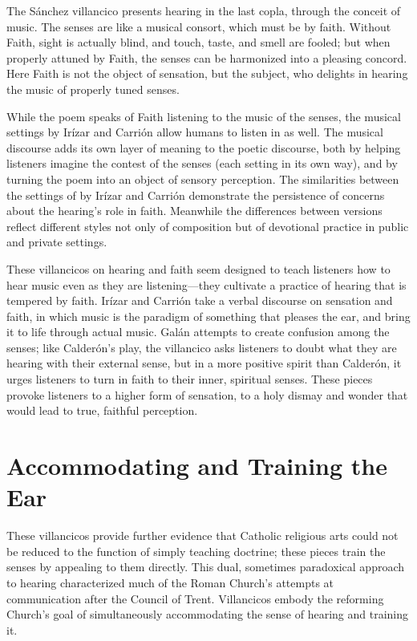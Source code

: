 The Sánchez villancico presents hearing in the last copla, through the conceit
of music.
The senses are  like a musical consort, which must be
 by faith.
Without Faith, sight is actually blind, and touch, taste, and smell are fooled;
but when properly attuned by Faith, the senses can be harmonized into a pleasing
concord.
Here Faith is not the object of sensation, but the subject, who delights in
hearing the music of properly tuned senses.

While the poem speaks of Faith listening to the music of the senses, the musical
settings by Irízar and Carrión allow humans to listen in as well.
The musical discourse adds its own layer of meaning to the poetic discourse,
both by helping listeners imagine the contest of the senses (each setting in its
own way), and by turning the poem into an object of sensory perception.
The similarities between the settings of  by Irízar and
Carrión demonstrate the persistence of concerns about the hearing's role in
faith.
Meanwhile the differences between versions reflect different styles not only of
composition but of devotional practice in public and private settings.

These villancicos on hearing and faith seem designed to teach listeners how to
hear music even as they are listening---they cultivate a practice of hearing
that is tempered by faith.
Irízar and Carrión take a verbal discourse on sensation and faith, in which
music is the paradigm of something that pleases the ear, and bring it to life
through actual music.
Galán attempts to create confusion among the senses; like Calderón's play, the
villancico asks listeners to doubt what they are hearing with their external
sense, but in a more positive spirit than Calderón, it urges listeners to turn
in faith to their inner, spiritual senses.
These pieces provoke listeners to a higher form of sensation, to a holy dismay
and wonder that would lead to true, faithful perception.

\section{Accommodating and Training the Ear}

These villancicos provide further evidence that Catholic religious arts could
not be reduced to the function of simply teaching doctrine; these pieces train
the senses by appealing to them directly.
This dual, sometimes paradoxical approach to hearing characterized much of the
Roman Church's attempts at communication after the Council of Trent.
Villancicos embody the reforming Church's goal of simultaneously accommodating
the sense of hearing and training it.

